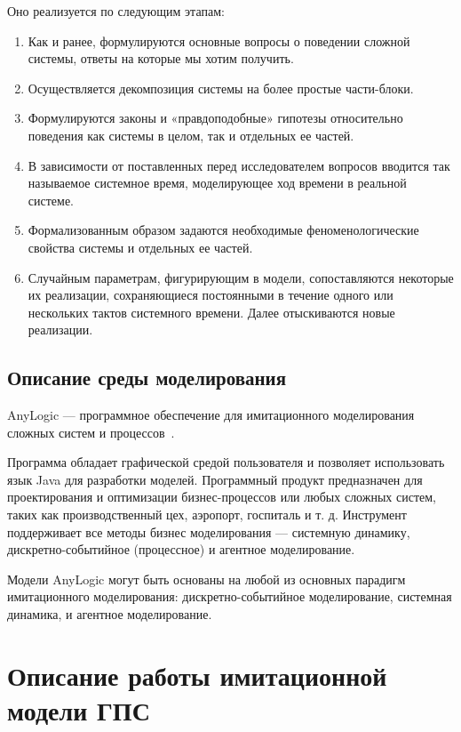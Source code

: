 Оно реализуется по следующим этапам:

\begin{enumerate}
    \item Как и ранее, формулируются основные вопросы о поведении сложной системы, ответы на которые мы хотим получить.
    \item Осуществляется декомпозиция системы на более простые части-блоки.
    \item Формулируются законы и «правдоподобные» гипотезы относительно поведения как системы в целом, так и отдельных ее частей.
    \item В зависимости от поставленных перед исследователем вопросов вводится так называемое системное время, моделирующее ход времени в реальной системе.
    \item Формализованным образом задаются необходимые феноменологические свойства системы и отдельных ее частей.
    \item Случайным параметрам, фигурирующим в модели, сопоставляются некоторые их реализации, сохраняющиеся постоянными в течение одного или нескольких тактов системного времени. Далее отыскиваются новые реализации.
\end{enumerate}

\subsection{Описание среды моделирования}

AnyLogic --- программное обеспечение для имитационного моделирования сложных систем и процессов~\cite{karp:modelling}.

Программа обладает графической средой пользователя и позволяет использовать язык Java для разработки моделей. Программный продукт предназначен для проектирования и оптимизации бизнес-процессов или любых сложных систем, таких как производственный цех, аэропорт, госпиталь и т. д. Инструмент поддерживает все методы бизнес моделирования --- системную динамику, дискретно-событийное (процессное) и агентное моделирование.

Модели AnyLogic могут быть основаны на любой из основных парадигм имитационного моделирования: дискретно-событийное моделирование, системная динамика, и агентное моделирование.

\section{Описание работы имитационной модели ГПС}

